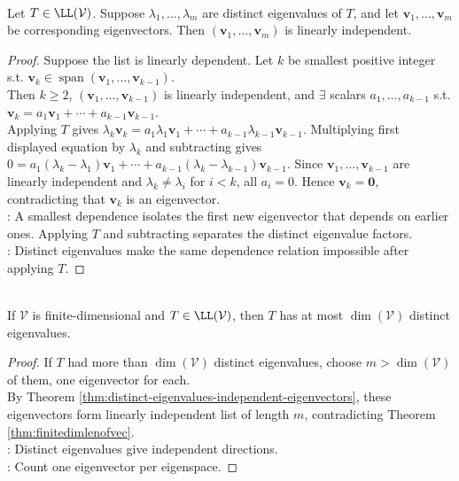 \begin{theorem} \label{thm:distinct-eigenvalues-independent-eigenvectors} \\
Let $T\in\LL(\mathcal{V})$. Suppose $\lambda_1,\ldots,\lambda_m$ are distinct eigenvalues of $T$, and let $\mathbf{v}_1,\ldots,\mathbf{v}_m$ be corresponding eigenvectors. Then $(\mathbf{v}_1,\ldots,\mathbf{v}_m)$ is linearly independent.
\begin{proof}
Suppose the list is linearly dependent. Let $k$ be smallest positive integer s.t. $\mathbf{v}_k\in\operatorname{span}(\mathbf{v}_1,\ldots,\mathbf{v}_{k-1})$.\\
Then $k\geq2$, $(\mathbf{v}_1,\ldots,\mathbf{v}_{k-1})$ is linearly independent, and $\exists$ scalars $a_1,\ldots,a_{k-1}$ s.t. $\mathbf{v}_k=a_1\mathbf{v}_1+\cdots+a_{k-1}\mathbf{v}_{k-1}$.\\
Applying $T$ gives $\lambda_k\mathbf{v}_k=a_1\lambda_1\mathbf{v}_1+\cdots+a_{k-1}\lambda_{k-1}\mathbf{v}_{k-1}$.
Multiplying first displayed equation by $\lambda_k$ and subtracting gives $0=a_1(\lambda_k-\lambda_1)\mathbf{v}_1+\cdots+a_{k-1}(\lambda_k-\lambda_{k-1})\mathbf{v}_{k-1}$.
Since $\mathbf{v}_1,\ldots,\mathbf{v}_{k-1}$ are linearly independent and $\lambda_k\neq\lambda_i$ for $i<k$, all $a_i=0$. Hence $\mathbf{v}_k=\mathbf{0}$, contradicting that $\mathbf{v}_k$ is an eigenvector.\\
: A smallest dependence isolates the first new eigenvector that depends on earlier ones. Applying $T$ and subtracting separates the distinct eigenvalue factors.\\
: Distinct eigenvalues make the same dependence relation impossible after applying $T$.
\end{proof}
\end{theorem}

\begin{corollary} \label{cor:number-of-distinct-eigenvalues} \\
If $\mathcal{V}$ is finite-dimensional and $T\in\LL(\mathcal{V})$, then $T$ has at most $\dim(\mathcal{V})$ distinct eigenvalues.
\begin{proof}
If $T$ had more than $\dim(\mathcal{V})$ distinct eigenvalues, choose $m>\dim(\mathcal{V})$ of them, one eigenvector for each.\\
By Theorem \ref{thm:distinct-eigenvalues-independent-eigenvectors}, these eigenvectors form linearly independent list of length $m$, contradicting Theorem \ref{thm:finitedimlenofvec}.\\
: Distinct eigenvalues give independent directions.\\
: Count one eigenvector per eigenspace.
\end{proof}
\end{corollary}

